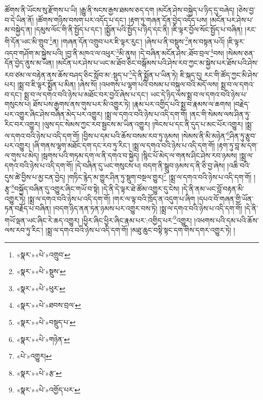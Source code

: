 ཚོགས་ནི་ཡོངས་སུ་རྫོགས་པ་ཡི། །རྒྱུ་ནི་སངས་རྒྱས་ཐམས་ཅད་དག །མངོན་ཤེས་བསྐྱེད་པ་ཉིད་དུ་བཞེད། །ཅེས་བྱ་བ་དེ་ཡིན་ནོ། །ཚོགས་གཉིས་བསག་པར་འདོད་པ་དང་། །རྟག་ཏུ་གཞན་དོན་བྱེད་འདོད་པས། །མངོན་པར་ཤེས་པ་མ་བསྐྱེད་ན། །དམུས་ལོང་གི་ནི་སྤྱོད་པ་དང་། །སྨྱོན་པའི་སྤྱོད་པ་ཉིད་དང་ནི། །ཇི་ལྟར་བྱོལ་སོང་སྤྱོད་པ་བཞིན། །རང་གི་དོན་ཡང་མི་གྲུབ་\footnote{«སྣར་»«པེ་»འགྲུབ་}ན། །གཞན་དོན་འགྲུབ་པར་ཇི་ལྟར་རུང་། །ཞེས་པ་ནི་བསྡུས་\footnote{«སྣར་»«པེ་»སྡུས་}ནས་བསྟན་པའོ། །ཇི་ལྟར་འདབ་གཤོག་མ་སྐྱེས་པའི། །བྱ་ནི་མཁའ་ལ་འཕུར་\footnote{«སྣར་»«པེ་»ཕུར་}མི་ནུས། །དེ་བཞིན་མངོན་ཤེས་:ཐོབ་བྲལ་\footnote{«སྣར་»«པེ་»ཐབས་བྲལ་}བས། །སེམས་ཅན་དོན་བྱེད་ནུས་མ་ཡིན། །མངོན་པར་ཤེས་པ་ཡང་མ་ཐོབ་ཅིང་བསྒོམས་པའི་ཤེས་རབ་ཀྱང་མ་སྐྱེས་པར་ཐོས་པའི་ཤེས་རབ་ཙམ་ལ་བརྟེན་ནས་ཆོས་བཤད་ཅིང་སློབ་མ་:སྡུད་པ་\footnote{«སྣར་»«པེ་»བསྡུད་པ་}དེ་ནི་སྨྱོན་པ་ཡིན་ཏེ། ཇི་སྐད་དུ། རང་གི་ཚོད་ཀྱང་མི་ཤེས་པར། །སྨྲ་བ་ཇི་ལྟར་སྨྱོན་པ་མིན། །ཞེས་སོ། །འཕགས་པ་ལྷག་པའི་བསམ་པ་བསྐུལ་བའི་མདོ་ལས། སྨྲ་བ་ལ་དགའ་བ་དང་། སྨྲ་བ་ལ་དགའ་བའི་ཉེས་པ་མཐོང་བར་བྱའོ་ཞེས་པ་དང་། ཡང་དེ་ཉིད་ལས་སྨྲ་བ་ལ་དགའ་བའི་ཉེས་པ་གསུངས་པ། ཐོས་པས་རྒྱགས་ནས་གུས་པར་མི་འགྱུར་ཏེ། །རྣམ་པར་འགྱིད་པའི་སྨྲ་བ་རྣམས་ལ་ཆགས། །བརྗེད་པར་འགྱུར་ཞིང་ཤེས་བཞིན་མེད་པར་འགྱུར། །སྨྲ་ལ་དགའ་བའི་ཉེས་པ་འདི་དག་གོ། །ནང་གི་སེམས་ལས་ཤིན་ཏུ་རིང་བར་འགྱུར། །ལུས་དང་སེམས་ཀྱང་རབ་སྦྱངས་མ་ཡིན་འགྱུར། །ཁེངས་པ་དང་ནི་དུད་པ་མང་པོར་འགྱུར། །སྨྲ་ལ་དགའ་བའི་ཉེས་པ་འདི་དག་གོ། །བྱིས་པ་དམ་པའི་ཆོས་བསམ་རབ་ཏུ་ཉམས། །སེམས་ནི་མི་མཉེན་\footnote{«སྣར་»«པེ་»གཉེན་}ཤིན་ཏུ་རྩུབ་པར་འགྱུར། །ཞི་གནས་ལྷག་མཐོང་དག་དང་རབ་ཏུ་རིང་། །སྨྲ་ལ་དགའ་བའི་ཉེས་པ་འདི་དག་གོ། །རྟག་ཏུ་བླ་མ་དག་ལ་གུས་པ་མེད། །སྦགས་པའི་གཏམ་དག་ལ་ནི་དགའ་བ་སྐྱེད། །སྙིང་པོ་མེད་ལ་གནས་ཤིང་ཤེས་རབ་ཉམས། །སྨྲ་ལ་དགའ་བའི་ཉེས་པ་འདི་དག་གོ། །དེ་བཞིན་དུ་ཡང་གསུངས་པ། བདག་ནི་སྒྲུབ་ཉམས་ད་ནི་ཅི་བྱ་ཞེས། །འཆི་བའི་དུས་ཚེ་བྱིས་པ་མྱ་ངན་བྱེད། །གཏིང་རྙེད་མ་གྱུར་ཤིན་ཏུ་སྡུག་བསྔལ་གྱུར།\footnote{«པེ་»འགྱུར།} །སྨྲ་ལ་དགའ་བའི་ཉེས་པ་འདི་དག་གོ། །རྩྭ་\footnote{«སྣར་»«པེ་»རྩ་}བསྐྱོད་བཞིན་དུ་འགྱུར་ཞིང་གཡོ་བ་སྟེ། །དེ་ནི་དེ་ལྟར་ཐེ་ཚོམ་འགྱུར་དུ་ངེས། །དེ་ནི་ནམ་ཡང་བློ་བརྟན་མི་འགྱུར་ཏེ། །སྨྲ་ལ་དགའ་བའི་ཉེས་པ་འདི་དག་གོ། །གར་ལ་ལྟ་བའི་ཁྲོད་ན་འདུག་པ་ཞིག །དཔའ་བོ་གཞན་གྱི་ཡོན་ཏན་བརྗོད་པ་བཞིན། །བདག་ཉིད་ནན་ཏན་ཉམས་པར་འགྱུར་བས་ཏེ། །སྨྲ་ལ་དགའ་བའི་ཉེས་པ་འདི་དག་གོ། །དེ་ནི་གཡོ་ལྡན་ཡང་ཞིང་རེ་ཆད་འགྱུར། །ཕྱིར་ཞིང་ཕྱིར་ཞིང་རྣམ་པར་:འགྱིད་པར་\footnote{«སྣར་»«པེ་»འགྱོད་པར་}འགྱུར། །འཕགས་པའི་དམ་པའི་ཆོས་ལས་རབ་ཏུ་རིང་། །སྨྲ་ལ་དགའ་བའི་ཉེས་པ་འདི་དག་གོ། །མཐུ་ཆུང་བསྟི་སྟང་དག་གིས་དགར་འགྱུར་ཏེ། །
